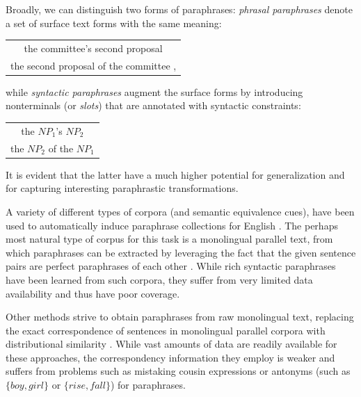 \documentclass[11pt]{article}
\begin{document}
Broadly, we can distinguish two forms of paraphrases: \emph{phrasal
  paraphrases} denote a set of surface text forms with the same
meaning:
\begin{center}
\begin{tabular}{c}
the committee's second proposal \\
the second proposal of the committee ,
\end{tabular}
\end{center}
while \emph{syntactic paraphrases} augment the surface forms by
introducing nonterminals (or \emph{slots}) that are annotated with
syntactic constraints:
\begin{center}
\begin{tabular}{c}
the $\mathit{NP}_1$'s $\mathit{NP}_2$ \\
the $\mathit{NP}_2$ of the $\mathit{NP}_1$
\end{tabular}
\end{center}
It is evident that the latter have a much higher potential for
generalization and for capturing interesting paraphrastic transformations.

A variety of different types of corpora (and semantic equivalence
cues), have been used to automatically induce paraphrase collections
for English \cite{Madnani2010}. The perhaps most natural type of
corpus for this task is a monolingual parallel text, from which
paraphrases can be extracted by leveraging the fact that the given
sentence pairs are perfect paraphrases of each other
\cite{Barzilay2001,Pang2003}. While rich syntactic paraphrases have
been learned from such corpora, they suffer from very limited data
availability and thus have poor coverage.

Other methods strive to obtain paraphrases from raw monolingual text,
replacing the exact correspondence of sentences in monolingual
parallel corpora with distributional similarity
\cite{Lin2001,Bhagat2008}. While vast amounts of data are readily
available for these approaches, the correspondency information they
employ is weaker and suffers from problems such as mistaking cousin
expressions or antonyms (such as $\{\mathit{boy}, \mathit{girl}\}$ or
$\{\mathit{rise}, \mathit{fall}\}$) for paraphrases.
\end{document}
